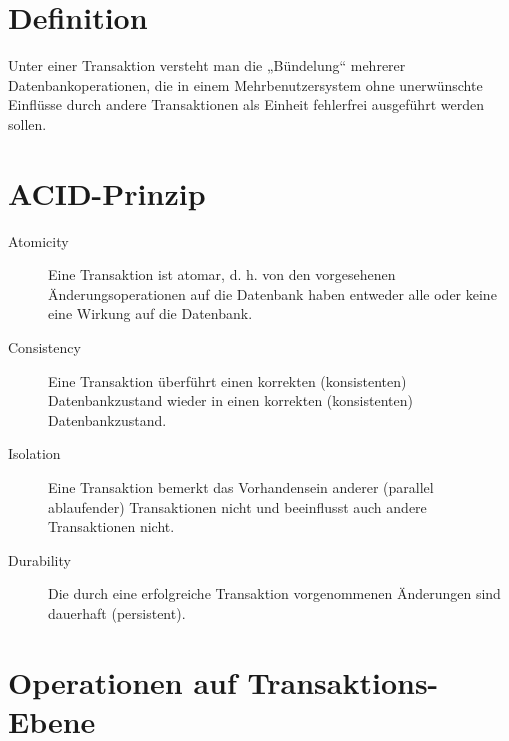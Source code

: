 \documentclass{lehramt-informatik-haupt}
\begin{document}
\section{Definition}

Unter einer Transaktion versteht man die „Bündelung“ mehrerer
Datenbankoperationen, die in einem Mehrbenutzersystem ohne unerwünschte
Einflüsse durch andere Transaktionen als Einheit fehlerfrei ausgeführt
werden sollen.

\section{ACID-Prinzip}

\begin{quellen}
\cite[Kapitel 9.5 „Eigenschaften Von Transaktionen“, Seite 299]{kemper}
\cite[Seite 1]{db:fs:5}
\cite{wiki:acid}
\end{quellen}

\begin{description}
\item[Atomicity]

Eine Transaktion ist atomar, d. h. von den vorgesehenen
Änderungsoperationen auf die Datenbank haben entweder alle oder keine
eine Wirkung auf die Datenbank.

\item[Consistency]

Eine Transaktion überführt einen korrekten (konsistenten)
Datenbankzustand wieder in einen korrekten (konsistenten)
Datenbankzustand.

\item[Isolation]

Eine Transaktion bemerkt das Vorhandensein anderer (parallel
ablaufender) Transaktionen nicht und beeinflusst auch andere
Transaktionen nicht.

\item[Durability]

Die durch eine erfolgreiche Transaktion vorgenommenen Änderungen sind
dauerhaft (persistent).

\end{description}

\section{Operationen auf Transaktions-Ebene}

\begin{quellen}
\item \cite[Seite 5]{db:fs:5}
\item \cite[Seite 211]{winter}
\end{quellen}
\end{document}
